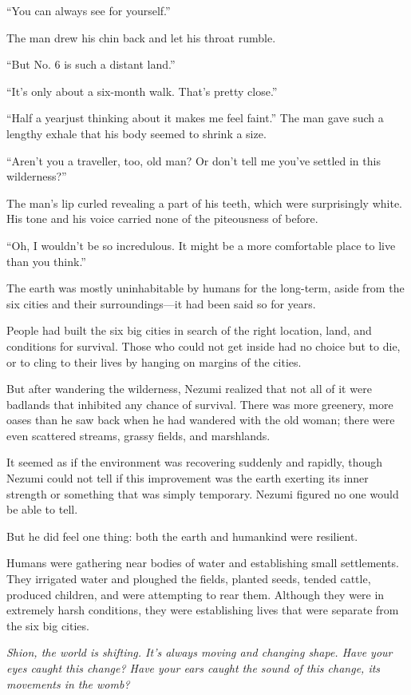 ``You can always see for yourself.''

The man drew his chin back and let his throat rumble.

``\el But No. 6 is such a distant land.''

``It's only about a six-month walk. That's pretty close.''

``Half a year\el just thinking about it makes me feel faint.'' The man
gave such a lengthy exhale that his body seemed to shrink a size.

``Aren't you a traveller, too, old man? Or don't tell me you've settled
in this wilderness?''

The man's lip curled revealing a part of his teeth, which were
surprisingly white. His tone and his voice carried none of the
piteousness of before.

``Oh, I wouldn't be so incredulous. It might be a more comfortable place
to live than you think.''

The earth was mostly uninhabitable by humans for the long-term, aside
from the six cities and their surroundings---it had been said so for
years.

People had built the six big cities in search of the right location,
land, and conditions for survival. Those who could not get inside had no
choice but to die, or to cling to their lives by hanging on margins of
the cities.

But after wandering the wilderness, Nezumi realized that not all of it
were badlands that inhibited any chance of survival. There was more
greenery, more oases than he saw back when he had wandered with the old
woman; there were even scattered streams, grassy fields, and marshlands.

It seemed as if the environment was recovering suddenly and rapidly,
though Nezumi could not tell if this improvement was the earth exerting
its inner strength or something that was simply temporary. Nezumi
figured no one would be able to tell.

But he did feel one thing: both the earth and humankind were resilient.

Humans were gathering near bodies of water and establishing small
settlements. They irrigated water and ploughed the fields, planted
seeds, tended cattle, produced children, and were attempting to rear
them. Although they were in extremely harsh conditions, they were
establishing lives that were separate from the six big cities.

\emph{Shion, the world is shifting. It's always moving and changing shape.
Have your eyes caught this change? Have your ears caught the sound of
this change, its movements in the womb?}

